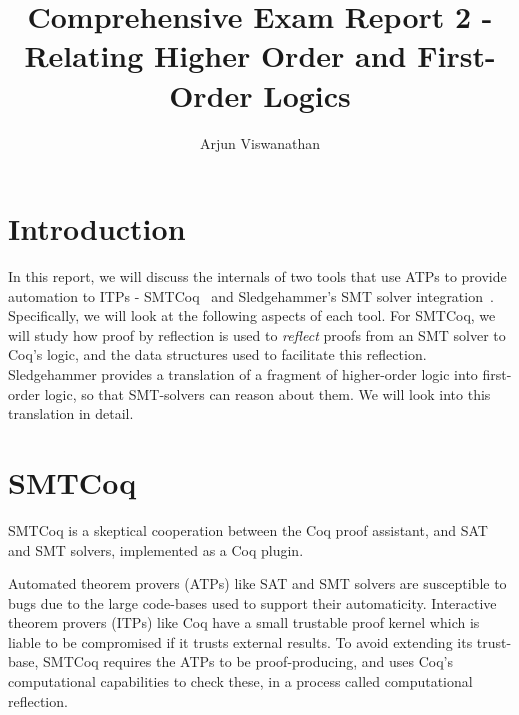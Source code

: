 \documentclass{article}
\begin{document}
\title{Comprehensive Exam Report 2 - Relating Higher Order and First-Order Logics}
\author{Arjun Viswanathan}
\date{}
\maketitle

\section{Introduction}
\label{sec:intro}
	In this report, we will discuss the 
	internals of two tools that use ATPs to 
	provide automation to ITPs - 
	SMTCoq~\cite{DBLP:phd/hal/Keller13} and 
	Sledgehammer's SMT solver 
	integration~\cite{bohme}. Specifically, 
	we will look at the following aspects 
	of each tool. For SMTCoq, we will study 
	how proof by reflection is used to 
	\textit{reflect} proofs from an SMT solver
	to Coq's logic, and the data structures 
	used to facilitate this reflection.
	Sledgehammer provides a translation of 
	a fragment of higher-order logic into 
	first-order logic, so that 
	SMT-solvers can reason about them. We 
	will look into this translation in 
	detail.

\section{SMTCoq}
\label{sec:smtcoq}
	SMTCoq is a skeptical cooperation between 
	the Coq proof assistant, and SAT and SMT 
	solvers, implemented as a Coq 
	plugin.
	
	Automated theorem provers (ATPs) like SAT 
	and SMT solvers are susceptible to bugs 
	due to the large code-bases used to 
	support	their automaticity. Interactive 
	theorem provers (ITPs) like Coq have a 
	small trustable proof kernel which is 
	liable to be compromised if it trusts 
	external results. To avoid extending 
	its trust-base, SMTCoq requires the 
	ATPs to be proof-producing, and uses 
	Coq's computational capabilities to 
	check these, in a process called 
	computational reflection. 
	
\end{document}

